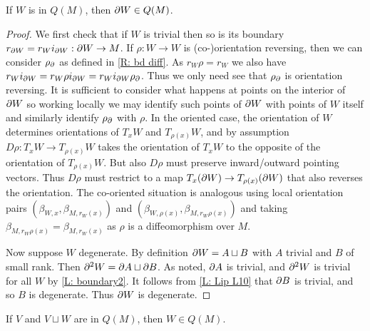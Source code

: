 \begin{lemma}\label{L: bd defined}
If $W$ is in $Q(M)$, then  $\partial W\in Q(M)$.
\end{lemma}
\begin{proof}
We first check that if $W$ is trivial then so is its boundary  $r_{\partial W}=r_Wi_{\partial W}:\partial W\to M$. If $\rho:W\to W$ is (co-)orientation reversing, then we can consider $\rho_\partial$ as defined in \cref{R: bd diff}. As $r_W\rho=r_W$ we also have $r_Wi_{\partial W}=r_W\rho i_{\partial W}= r_W i_{\partial W} \rho_\partial$. Thus we only need see that $\rho_\partial$ is orientation reversing. It is sufficient to consider what happens at points on the interior of $\partial W$ so working locally we may identify such points of $\partial W$ with points of $W$ itself and similarly identify $\rho_\partial$ with $\rho$. In the oriented case, the orientation of $W$ determines orientations of  $T_xW$ and $T_{\rho(x)}W$, and by assumption $D\rho: T_xW\to T_{\rho(x)}W$ takes the orientation of $T_xW$ to the opposite of the orientation of $T_{\rho(x)}W$. But also $D\rho$ must preserve inward/outward pointing vectors. Thus $D\rho$ must restrict to a map $T_x (\partial W)\to T_{\rho(x)}(\partial W)$ that also reverses the orientation. The co-oriented situation is analogous using local orientation pairs  $\left(\beta_{W,x}, \beta_{M,r_W(x)}\right)$ and $\left(\beta_{W,\rho(x)}, \beta_{M,r_W\rho(x)}\right)$ and taking  $\beta_{M,r_W\rho(x)}=\beta_{M,r_W(x)}$ as $\rho$ is a diffeomorphism over $M$.



Now suppose $W$ degenerate. By definition $\partial W=A\sqcup B$ with $A$ trivial and $B$  of small rank. Then $\partial^2W=\partial A\sqcup \partial B$. As noted, $\partial A$ is trivial, and  $\partial^2 W$ is trivial for all $W$ by  \cref{L: boundary2}. It follows from \cref{L: Lip L10} that $\partial B$ is trivial, and so $B$ is degenerate. Thus $\partial W$ is degenerate.
\end{proof}


\begin{lemma}\label{L: Lipy12}
If $V$ and $V\sqcup W$ are in $Q(M)$, then $W\in Q(M)$.
\end{lemma}

